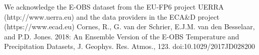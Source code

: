 
	
We acknowledge the E-OBS dataset from the EU-FP6 project UERRA (http://www.uerra.eu) and the data providers in the ECA\&D project (https://www.ecad.eu)
Cornes, R., G. van der Schrier, E.J.M. van den Besselaar, and P.D. Jones. 2018: An Ensemble Version of the E-OBS Temperature and Precipitation Datasets, J. Geophys. Res. Atmos., 123. doi:10.1029/2017JD028200